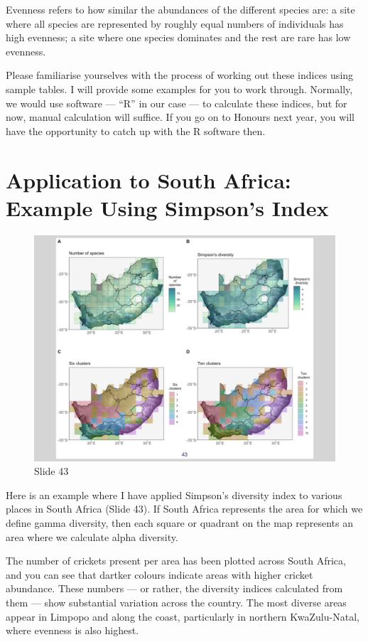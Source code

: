 \documentclass[
  10pt,
]{book}
\begin{document}
Evenness refers to how similar the abundances of the different species
are: a site where all species are represented by roughly equal numbers
of individuals has high evenness; a site where one species dominates and
the rest are rare has low evenness.

Please familiarise yourselves with the process of working out these
indices using sample tables. I will provide some examples for you to
work through. Normally, we would use software --- ``R'' in our case ---
to calculate these indices, but for now, manual calculation will
suffice. If you go on to Honours next year, you will have the
opportunity to catch up with the R software then.

\section{Application to South Africa: Example Using Simpson's
Index}\label{application-to-south-africa-example-using-simpsons-index}

\begin{figure}[ht]
\centering
\includegraphics[width=0.8\linewidth]{../images/BDC334/BDC334-043.jpeg}
\caption*{Slide 43}
\end{figure}

Here is an example where I have applied Simpson's diversity index to
various places in South Africa (Slide 43). If South Africa represents
the area for which we define gamma diversity, then each square or
quadrant on the map represents an area where we calculate alpha
diversity.

The number of crickets present per area has been plotted across South
Africa, and you can see that dartker colours indicate areas with higher
cricket abundance. These numbers --- or rather, the diversity indices
calculated from them --- show substantial variation across the country.
The most diverse areas appear in Limpopo and along the coast,
particularly in northern KwaZulu-Natal, where evenness is also highest.
\end{document}
